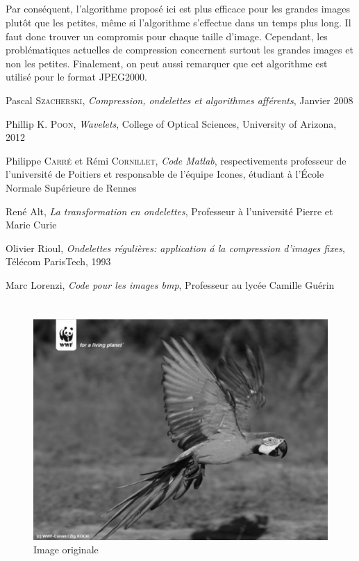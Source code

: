 \documentclass[a4paper,10pt]{report}
\theoremstyle{break}
\begin{document}
  \paragraph{} Par cons\'{e}quent, l'algorithme propos\'{e} ici est plus efficace pour les grandes images plut\^{o}t que les petites, 
      m\^{e}me si l'algorithme s'effectue dans un temps plus long. Il faut donc trouver un compromis pour chaque taille d'image.
      Cependant, les probl\'{e}matiques actuelles de compression concernent surtout les grandes images et non les petites. 
      Finalement, on peut aussi remarquer que cet algorithme est utilis\'{e} pour le format JPEG2000.

\newpage

  \begin{thebibliography}{1}
      Pascal \textsc{Szacherski},
      \emph{Compression, ondelettes et algorithmes aff\'{e}rents},
      Janvier 2008
      
      Phillip \textsc{K. Poon},
      \emph{Wavelets},
      College of Optical Sciences, University of Arizona,
      2012
      
      Philippe \textsc{Carr\'{e}} et R\'{e}mi \textsc{Cornillet},
      \emph{Code Matlab},
      respectivements professeur de l'universit\'{e} de Poitiers et responsable de l'\'{e}quipe Icones,
      \'{e}tudiant \`{a} l'\'{E}cole Normale Sup\'{e}rieure de Rennes

      Ren\'{e} Alt,
      \emph{La transformation en ondelettes},
      Professeur \`{a} l'universit\'{e} Pierre et Marie Curie
    
      Olivier Rioul,
      \emph{Ondelettes r\'{e}guli\`{e}res: application \'{a} la compression d'images fixes},
      T\'{e}l\'{e}com ParisTech, 1993
      
      Marc Lorenzi,
      \emph{Code pour les images bmp},
      Professeur au lyc\'{e}e Camille Gu\'{e}rin
  \end{thebibliography}

\appendix

\chapter{}

  \begin{figure}[!h]
      \centering
      
      \includegraphics[width = 0.5 \linewidth]{ara_orig.eps}
      
      \caption{Image originale}
  \end{figure}
\end{document}
